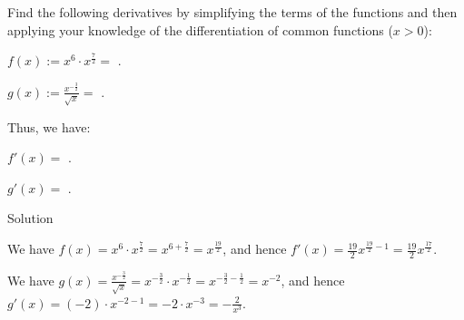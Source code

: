 \begin{MExercises}

\begin{MExercise}
Find the following derivatives by simplifying the terms of the functions and then 
applying your knowledge of the differentiation of common functions
($x > 0$):
\begin{MExerciseItems}
\item $f(x) := x^6 \cdot x^{\frac{7}{2}} = $
. %
\item $g(x) := \frac{x^{-\frac{3}{2}}}{\sqrt{x}} = $
.
\end{MExerciseItems}
Thus, we have:
\begin{MExerciseItems}
\item $f'(x) = $ .
\item $g'(x) = $ .
\end{MExerciseItems}
\begin{MHint}{Solution}
 \begin{MExerciseItems}
  \item We have $f(x) = x^6 \cdot x^\frac72 = x^{6 + \frac72} = x^\frac{19}{2}$, and hence $f'(x) = \frac{19}{2} x^{\frac{19}{2} - 1} = \frac{19}{2} x^\frac{17}{2}$.
  \item We have $g(x) = \frac{x^{-\frac32}}{\sqrt{x}} = x^{- \frac32} \cdot x^{- \frac12} = x^{- \frac32 - \frac12} = x^{-2}$,
  and hence $g'(x) = (-2) \cdot x^{-2 -1} = -2 \cdot x^{-3} = - \frac{2}{x^3}$.
 \end{MExerciseItems}
\end{MHint}
\end{MExercise}


\end{MExercises}
